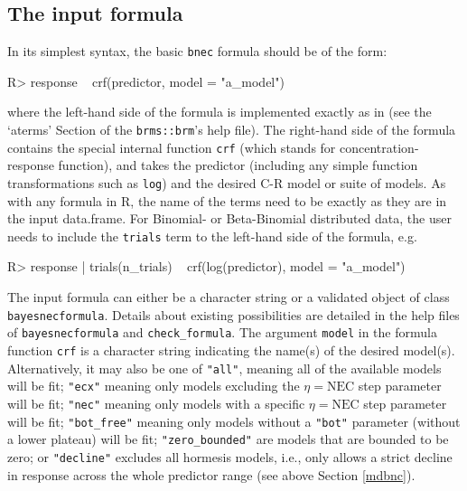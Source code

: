 \documentclass[
  shortnames]{jss}
\begin{document}
\hypertarget{the-input-formula}{%
\subsection{The input formula}\label{the-input-formula}}

In its simplest syntax, the basic \texttt{bnec} formula should be of the form:

\begin{CodeChunk}
\begin{CodeInput}
R> response ~ crf(predictor, model = "a_model")
\end{CodeInput}
\end{CodeChunk}

where the left-hand side of the formula is implemented exactly as in  (see the `aterms' Section of the \texttt{brms::brm}'s help file). The right-hand side of the formula contains the special internal function \texttt{crf} (which stands for concentration-response function), and takes the predictor (including any simple function transformations such as \texttt{log}) and the desired C-R model or suite of models. As with any formula in R, the name of the terms need to be exactly as they are in the input data.frame. For Binomial- or Beta-Binomial distributed data, the user needs to include the \texttt{trials} term to the left-hand side of the formula, e.g.

\begin{CodeChunk}
\begin{CodeInput}
R> response | trials(n_trials) ~ crf(log(predictor), model = "a_model")
\end{CodeInput}
\end{CodeChunk}

The input formula can either be a character string or a validated object of class \texttt{bayesnecformula}. Details about existing possibilities are detailed in the help files of \texttt{bayesnecformula} and \texttt{check\_formula}. The argument \texttt{model} in the formula function \texttt{crf} is a character string indicating the name(s) of the desired model(s). Alternatively, it may also be one of \texttt{"all"}, meaning all of the available models will be fit; \texttt{"ecx"} meaning only models excluding the \(\eta = \text{NEC}\) step parameter will be fit; \texttt{"nec"} meaning only models with a specific \(\eta = \text{NEC}\) step parameter will be fit; \texttt{"bot\_free"} meaning only models without a \texttt{"bot"} parameter (without a lower plateau) will be fit; \texttt{"zero\_bounded"} are models that are bounded to be zero; or \texttt{"decline"} excludes all hormesis models, i.e., only allows a strict decline in response across the whole predictor range (see above Section \ref{mdbnc}).
\end{document}
